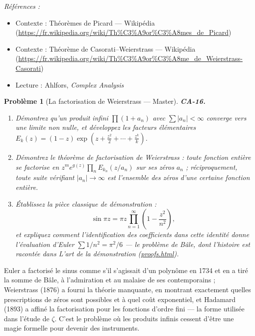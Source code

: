 \documentclass[11pt]{article}
\newtheorem{problem}{Problème}
\newenvironment{refs}{\par\small\noindent\emph{Références :}\begin{itemize}\setlength\itemsep{0pt}}{\end{itemize}\normalsize}
\begin{document}
\begin{refs}
\item Contexte : Théorèmes de Picard --- Wikipédia (\url{https://fr.wikipedia.org/wiki/Th%C3%A9or%C3%A8mes_de_Picard})
\item Contexte : Théorème de Casorati--Weierstrass --- Wikipédia (\url{https://fr.wikipedia.org/wiki/Th%C3%A9or%C3%A8me_de_Weierstrass-Casorati})
\item Lecture : Ahlfors, \textit{Complex Analysis}
\end{refs}

\bigskip

\begin{problem}[{La factorisation de Weierstrass --- Master}]
\textbf{CA-16.} \begin{enumerate}
\item[(a)] Démontrez qu'un produit infini $ \prod (1 + a_n) $
avec $ \sum |a_n| < \infty $ converge vers une limite non nulle, et développez les facteurs
élémentaires $ E_k(z) = (1 - z)\exp\!\left(z + \frac{z^2}{2} + \cdots + \frac{z^k}{k}\right) $.
\item[(b)] Démontrez le théorème de factorisation de Weierstrass : toute fonction entière se factorise en
$ z^m e^{g(z)} \prod_n E_{k_n}(z/a_n) $ sur ses zéros $ a_n $ ; réciproquement, toute suite
vérifiant $ |a_n| \to \infty $ est l'ensemble des zéros d'une certaine fonction entière.
\item[(c)] Établissez la pièce classique de
démonstration :
\[ \sin \pi z = \pi z \prod_{n=1}^{\infty} \left( 1 - \frac{z^2}{n^2} \right), \]
et expliquez comment l'identification des coefficients dans cette identité donne l'évaluation
d'Euler $ \sum 1/n^2 = \pi^2/6 $ --- le problème de Bâle, dont l'histoire est racontée dans
L'art de la démonstration (\url{proofs.html}).
\end{enumerate}

\end{problem}

\noindent Euler a factorisé le sinus comme s'il s'agissait d'un polynôme en 1734 et en a
tiré la somme de Bâle, à l'admiration et au malaise de ses contemporains ; Weierstrass (1876) a
fourni la théorie manquante, en montrant exactement quelles prescriptions de zéros sont possibles et
à quel coût exponentiel, et Hadamard (1893) a affiné la factorisation pour les fonctions d'ordre
fini --- la forme utilisée dans l'étude de $\zeta$. C'est le problème où les produits infinis cessent d'être
une magie formelle pour devenir des instruments.
\end{document}
